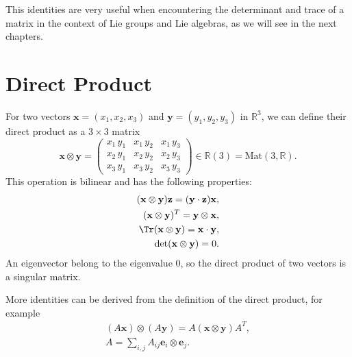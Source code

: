 This identities are very useful when encountering the determinant and trace of a matrix in the context of Lie groups and Lie algebras, as we will see in the next chapters.

\section{Direct Product}

For two vectors \(\mathbf{x} = (x_1, x_2, x_3)\) and \(\mathbf{y} = (y_1, y_2, y_3)\) in \(\mathbb{R}^3\), we can define their direct product as a \(3\times 3\) matrix
\[
    \mathbf{x} \otimes \mathbf{y} = \begin{pmatrix}
        x_1\, y_1 & x_1\, y_2 & x_1\, y_3 \\
        x_2\, y_1 & x_2\, y_2 & x_2\, y_3 \\
        x_3\, y_1 & x_3\, y_2 & x_3\, y_3
    \end{pmatrix} \in \mathbb{R}(3) = \text{Mat}(3, \mathbb{R}).
\]
This operation is bilinear and has the following properties:
\[
    \begin{aligned}
        (\mathbf{x} \otimes \mathbf{y}) \mathbf{z} = (\mathbf{y} \cdot \mathbf{z}) \mathbf{x}, \\
        (\mathbf{x} \otimes \mathbf{y})^T = \mathbf{y} \otimes \mathbf{x},                     \\
        \Tr(\mathbf{x} \otimes \mathbf{y}) = \mathbf{x} \cdot \mathbf{y},                      \\
        \det(\mathbf{x} \otimes \mathbf{y}) = 0.
    \end{aligned}
\]
An eigenvector belong to the eigenvalue 0, so the direct product of two vectors is a singular matrix.

More identities can be derived from the definition of the direct product, for example
\[
    \begin{aligned}
        (A \mathbf{x}) \otimes (A \mathbf{y}) = A (\mathbf{x} \otimes \mathbf{y}) A^T, \\
        A = \sum_{i, j} A_{ij} \mathbf{e}_i \otimes \mathbf{e}_j.
    \end{aligned}
\]